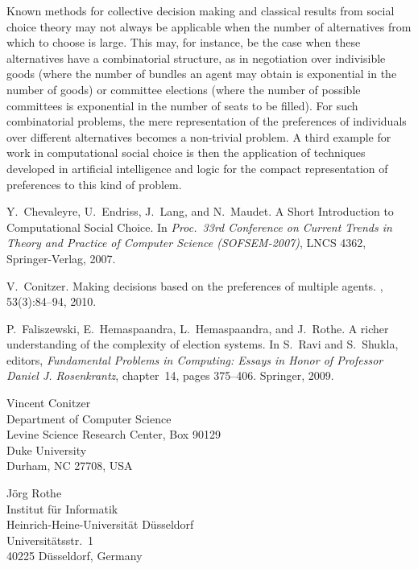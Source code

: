 \documentclass{comsoc2010}
\begin{document}
Known methods for collective decision making and classical results from 
social choice theory may not always be applicable when the number of 
alternatives from which to choose is large. This may, for instance, be 
the case when these alternatives have a combinatorial structure, as in 
negotiation over indivisible goods (where the number of bundles an agent 
may obtain is exponential in the number of goods) or committee elections 
(where the number of possible committees is exponential in the number 
of seats to be filled). For such combinatorial problems, the mere 
representation of the preferences of individuals over different 
alternatives becomes a non-trivial problem. A third example for work 
in computational social choice is then the application of techniques 
developed in artificial intelligence and logic for the compact 
representation of preferences to this kind of problem. 



\begin{thebibliography}{1}

Y.~Chevaleyre, U.~Endriss, J.~Lang, and N.~Maudet. 
A Short Introduction to Computational Social Choice. 
In \emph{Proc.\ 33rd Conference on Current Trends in 
Theory and Practice of Computer Science (SOFSEM-2007)}, 
LNCS 4362, Springer-Verlag, 2007.

V.~Conitzer.
\newblock Making decisions based on the preferences of multiple agents.
, 53(3):84--94, 2010.

P.~Faliszewski, E.~Hemaspaandra, L.~Hemaspaandra, and J.~Rothe.
\newblock A richer understanding of the complexity of election systems.
\newblock In S.~Ravi and S.~Shukla, editors, {\em Fundamental Problems in
  Computing: {Essays} in Honor of {Professor} {Daniel} {J.} {Rosenkrantz}},
  chapter~14, pages 375--406. Springer, 2009.

\end{thebibliography}



\begin{contact}
Vincent Conitzer\\
Department of Computer Science\\
Levine Science Research Center, Box 90129\\
Duke University\\
Durham, NC 27708, USA\\
\end{contact}

\begin{contact}
J\"org Rothe\\
Institut f\"ur Informatik\\
Heinrich-Heine-Universit\"at D\"usseldorf\\
Universit\"atsstr.~1\\
40225 D\"usseldorf, Germany\\
\end{contact}

\end{document}

